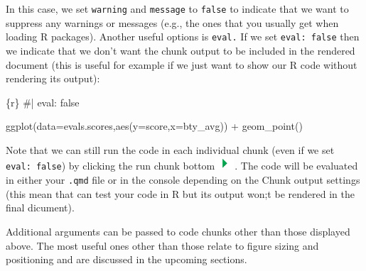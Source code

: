 \documentclass[
  letterpaper,
  DIV=11,
  numbers=noendperiod]{scrartcl}
\newenvironment{Shaded}{\begin{snugshade}}{\end{snugshade}}
\newcommand{\AttributeTok}[1]{\textcolor[rgb]{0.40,0.45,0.13}{#1}}
\newcommand{\CommentTok}[1]{\textcolor[rgb]{0.37,0.37,0.37}{#1}}
\newcommand{\FunctionTok}[1]{\textcolor[rgb]{0.28,0.35,0.67}{#1}}
\newcommand{\InformationTok}[1]{\textcolor[rgb]{0.37,0.37,0.37}{#1}}
\newcommand{\NormalTok}[1]{\textcolor[rgb]{0.00,0.23,0.31}{#1}}
\newcommand{\SpecialCharTok}[1]{\textcolor[rgb]{0.37,0.37,0.37}{#1}}
\begin{document}
In this case, we set \texttt{warning} and \texttt{message} to
\texttt{false} to indicate that we want to suppress any warnings or
messages (e.g., the ones that you usually get when loading R packages).
Another useful options is \texttt{eval.} If we set \texttt{eval:\ false}
then we indicate that we don't want the chunk output to be included in
the rendered document (this is useful for example if we just want to
show our R code without rendering its output):

\begin{Shaded}
\begin{Highlighting}[]
\InformationTok{\textasciigrave{}\textasciigrave{}\textasciigrave{}\{r\}}
\CommentTok{\#| eval: false}

\FunctionTok{ggplot}\NormalTok{(}\AttributeTok{data=}\NormalTok{evals.scores,}\FunctionTok{aes}\NormalTok{(}\AttributeTok{y=}\NormalTok{score,}\AttributeTok{x=}\NormalTok{bty\_avg)) }\SpecialCharTok{+}
  \FunctionTok{geom\_point}\NormalTok{()}
\InformationTok{\textasciigrave{}\textasciigrave{}\textasciigrave{}}
\end{Highlighting}
\end{Shaded}

\begin{tcolorbox}[enhanced jigsaw, colback=white, toprule=.15mm, arc=.35mm, colbacktitle=quarto-callout-note-color!10!white, titlerule=0mm, colframe=quarto-callout-note-color-frame, title=\textcolor{quarto-callout-note-color}{\faInfo}\hspace{0.5em}{Note}, bottomtitle=1mm, toptitle=1mm, coltitle=black, rightrule=.15mm, opacityback=0, bottomrule=.15mm, breakable, leftrule=.75mm, left=2mm, opacitybacktitle=0.6]

Note that we can still run the code in each individual chunk (even if we
set \texttt{eval:\ false}) by clicking the run chunk
bottom\includegraphics[width=0.29167in,height=0.1875in]{images/run_chunk.png}.
The code will be evaluated in either your \texttt{.qmd} file or in the
console depending on the Chunk output settings (this mean that can test
your code in R but its output won;t be rendered in the final dicument).

\end{tcolorbox}

Additional arguments can be passed to code chunks other than those
displayed above. The most useful ones other than those relate to figure
sizing and positioning and are discussed in the upcoming sections.
\end{document}
